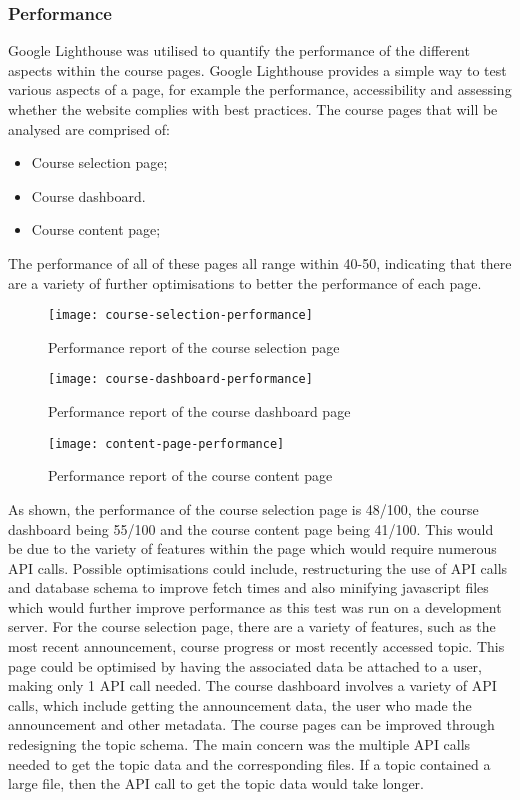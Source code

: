 \subsubsection{Performance}
Google Lighthouse was utilised to quantify the performance of the different aspects within the course pages. Google Lighthouse provides a simple way to test various aspects of a page,
 for example the performance, accessibility and assessing whether the website complies with best practices.
The course pages that will be analysed are comprised of:
\begin{itemize}
    \item Course selection page;
    \item Course dashboard.
    \item Course content page;
\end{itemize}

The performance of all of these pages all range within 40-50, indicating that there are a variety of further optimisations to better the performance of each page.

\begin{figure}[h!]
    \centering
    \texttt{[image: course-selection-performance]}
    \caption{Performance report of the course selection page}
\end{figure}

\begin{figure}[h!]
    \centering
    \texttt{[image: course-dashboard-performance]}
    \caption{Performance report of the course dashboard page}
\end{figure}

\begin{figure}[h!]
    \centering
    \texttt{[image: content-page-performance]}
    \caption{Performance report of the course content page}
\end{figure}

As shown, the performance of the course selection page is 48/100, the course dashboard being 55/100 and the course content page being 41/100. This would be due to the variety of features within the page which would require numerous API calls.
Possible optimisations could include, restructuring the use of API calls and database schema to improve fetch times and also minifying javascript files which would further improve performance as this test was run on a development server.
For the course selection page, there are a variety of features, such as the most recent announcement, course progress or most recently accessed topic. This page could be optimised by having the associated data be attached to a user, making only 1 API call needed.
The course dashboard involves a variety of API calls, which include getting the announcement data, the user who made the announcement and other metadata. 
The course pages can be improved through redesigning the topic schema. The main concern was the multiple API calls needed to get the topic data and the corresponding files. If a topic contained a large file, then the API call to get the topic data would take longer.

